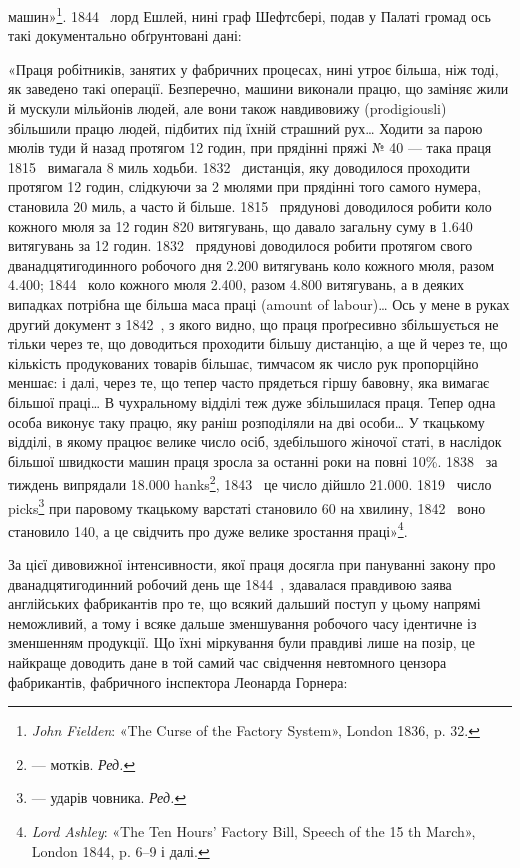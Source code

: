 \parcont{}  %
машин»\footnote{
\emph{John Fielden}: «The Curse of the Factory System», London
1836, p. 32.
}. 1844~ лорд Ешлей, нині граф Шефтсбері, подав
у Палаті громад ось такі документально обґрунтовані дані:

«Праця робітників, занятих у фабричних процесах, нині утроє
більша, ніж тоді, як заведено такі операції. Безперечно, машини
виконали працю, що заміняє жили й мускули мільйонів людей,
але вони також навдивовижу (prodigiousli) збільшили працю
людей, підбитих під їхній страшний рух\dots{} Ходити за парою
мюлів туди й назад протягом 12 годин, при прядінні пряжі
№ 40 — така праця 1815~ вимагала 8 миль ходьби. 1832~
дистанція, яку доводилося проходити протягом 12 годин, слідкуючи
за 2 мюлями при прядінні того самого нумера, становила
20 миль, а часто й більше. 1815~ прядунові доводилося робити
коло кожного мюля за 12 годин 820 витягувань, що давало загальну
суму в \num{1.640} витягувань за 12 годин. 1832~ прядунові
доводилося робити протягом свого дванадцятигодинного робочого
дня \num{2.200} витягувань коло кожного мюля, разом \num{4.400}; 1844~
коло кожного мюля \num{2.400}, разом \num{4.800} витягувань, а в деяких
випадках потрібна ще більша маса праці (amount of labour)\dots{}
Ось у мене в руках другий документ з 1842~, з якого видно,
що праця проґресивно збільшується не тільки через те, що доводиться
проходити більшу дистанцію, а ще й через те, що кількість
продукованих товарів більшає, тимчасом як число рук пропорційно
меншає: і далі, через те, що тепер часто прядеться гіршу
бавовну, яка вимагає більшої праці\dots{} В чухральному відділі
теж дуже збільшилася праця. Тепер одна особа виконує таку
працю, яку раніш розподіляли на дві особи\dots{} У ткацькому відділі,
в якому працює велике число осіб, здебільшого жіночої
статі, в наслідок більшої швидкости машин праця зросла за
останні роки на повні 10\%. 1838~ за тиждень випрядали \num{18.000}
hanks\footnote*{
— мотків. \emph{Ред.}
}, 1843~ це число дійшло \num{21.000}. 1819~ число picks\footnote*{
— ударів човника. \emph{Ред.}
}
при паровому ткацькому варстаті становило 60 на хвилину, 1842~
воно становило 140, а це свідчить про дуже велике зростання
праці»\footnote{
\emph{Lord Ashley}: «The Ten Hours’ Factory Bill, Speech of the 15 th
March», London 1844, p. 6--9 і далі.
}.

За цієї дивовижної інтенсивности, якої праця досягла при пануванні
закону про дванадцятигодинний робочий день ще 1844~,
здавалася правдивою заява англійських фабрикантів про те,
що всякий дальший поступ у цьому напрямі неможливий, а
тому і всяке дальше зменшування робочого часу ідентичне із
зменшенням продукції. Що їхні міркування були правдиві лише
на позір, це найкраще доводить дане в той самий час свідчення
невтомного цензора фабрикантів, фабричного інспектора Леонарда
Горнера:
